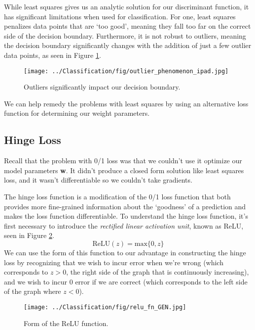 While least squares gives us an analytic solution for our discriminant function, it has significant limitations when used for classification. For one, least squares penalizes data points that are `too good', meaning they fall too far on the correct side of the decision boundary. Furthermore, it is not robust to outliers, meaning the decision boundary significantly changes with the addition of just a few outlier data points, as seen in Figure \ref{fig:outlier-phenomenon}.

\begin{figure}
    \centering
    \texttt{[image: ../Classification/fig/outlier\_phenomenon\_ipad.jpg]}
    \caption{Outliers significantly impact our decision boundary.}
    \label{fig:outlier-phenomenon}
\end{figure}

We can help remedy the problems with least squares by using an alternative loss function for determining our weight parameters.

\subsection{Hinge Loss}
Recall that the problem with 0/1 loss was that we couldn't use it optimize our model parameters \textbf{w}. It didn't produce a closed form solution like least squares loss, and it wasn't differentiable so we couldn't take gradients.

The hinge loss function is a modification of the 0/1 loss function that both provides more fine-grained information about the `goodness' of a prediction and makes the loss function differentiable. To understand the hinge loss function, it's first necessary to introduce the \textit{rectified linear activation unit}, known as ReLU, seen in Figure \ref{fig:relu-fn}.
\begin{equation}
	\text{ReLU}(z) = \text{max}\{0, z\}
\end{equation}
We can use the form of this function to our advantage in constructing the hinge loss by recognizing that we wish to incur error when we're wrong (which corresponds to $z > 0$, the right side of the graph that is continuously increasing), and we wish to incur 0 error if we are correct (which corresponds to the left side of the graph where $z < 0$).
\begin{figure}
    \centering
    \texttt{[image: ../Classification/fig/relu\_fn\_GEN.jpg]}
    \caption{Form of the ReLU function.}
    \label{fig:relu-fn}
\end{figure}

